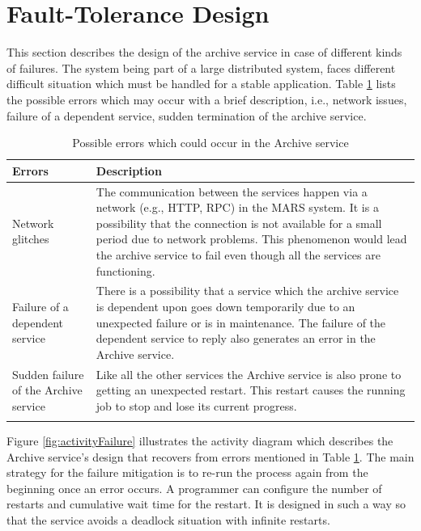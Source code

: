 \newpage
\section{Fault-Tolerance Design}
\label{sec:ftDesign}
This section describes the design of the archive service in case of different kinds of failures. The system being part of a large distributed system,
faces different difficult situation which must be handled for a stable application. Table \ref{table:probServices} lists the possible errors which 
may occur with a brief description, i.e., network issues, failure of a 
dependent service, sudden termination of the archive service. 
\begin{longtable}{|p{4cm}|p{10cm}|}
    \hline
        \textbf{Errors}  & \textbf{Description}\\
    \hline
        Network glitches & The communication between the services
        happen via a network (e.g., HTTP, RPC) in the MARS system. It is a possibility that the connection is not available for a small period due to network problems.
        This phenomenon would lead the archive service to fail even though all the services are functioning.\\
    \hline
        Failure of a dependent service & There is a possibility that a service which the archive service is dependent upon goes down temporarily due to an unexpected
        failure or is in maintenance. The failure of the dependent service to reply also generates an error in the Archive service.\\
    \hline
        Sudden failure of the Archive service & Like all the other services the Archive service is also prone to getting an unexpected restart. 
        This restart causes the running job to stop and lose its current progress.\\    
    \hline
    \caption{Possible errors which could occur in the Archive service}
    \label{table:probServices} 
\end{longtable}

Figure \ref{fig:activityFailure} illustrates the activity diagram which describes the Archive service's design that recovers from errors mentioned in
Table \ref{table:probServices}. The main strategy for the failure mitigation is to re-run the process again from the beginning once an error occurs. 
A programmer can configure the number of restarts and cumulative wait time for the restart. It is designed in such a way so that the service avoids a deadlock situation with infinite restarts.


